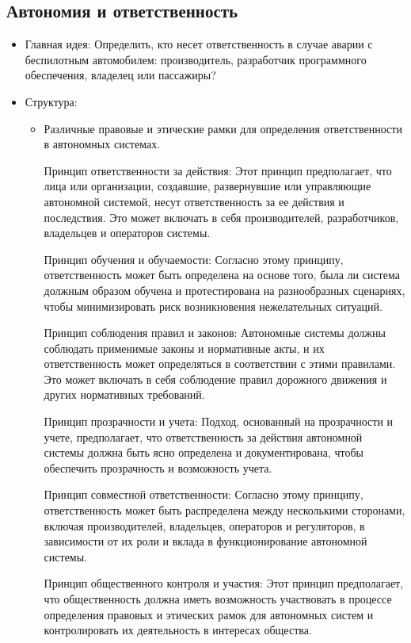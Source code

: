 \documentclass{article}
\begin{document}
\subsection{Автономия и ответственность}

\begin{itemize}
    \item Главная идея:  Определить, кто несет ответственность в случае аварии с беспилотным автомобилем: производитель, разработчик программного обеспечения, владелец или пассажиры?
    
    \item Структура:
    \begin{itemize}
        \item Различные правовые и этические рамки для определения ответственности в автономных системах.

        Принцип ответственности за действия: Этот принцип предполагает, что лица или организации, создавшие, развернувшие или управляющие автономной системой, несут ответственность за ее действия и последствия. Это может включать в себя производителей, разработчиков, владельцев и операторов системы.

        Принцип обучения и обучаемости: Согласно этому принципу, ответственность может быть определена на основе того, была ли система должным образом обучена и протестирована на разнообразных сценариях, чтобы минимизировать риск возникновения нежелательных ситуаций.

        Принцип соблюдения правил и законов: Автономные системы должны соблюдать применимые законы и нормативные акты, и их ответственность может определяться в соответствии с этими правилами. Это может включать в себя соблюдение правил дорожного движения и других нормативных требований.

        Принцип прозрачности и учета: Подход, основанный на прозрачности и учете, предполагает, что ответственность за действия автономной системы должна быть ясно определена и документирована, чтобы обеспечить прозрачность и возможность учета.

        Принцип совместной ответственности: Согласно этому принципу, ответственность может быть распределена между несколькими сторонами, включая производителей, владельцев, операторов и регуляторов, в зависимости от их роли и вклада в функционирование автономной системы.

        Принцип общественного контроля и участия: Этот принцип предполагает, что общественность должна иметь возможность участвовать в процессе определения правовых и этических рамок для автономных систем и контролировать их деятельность в интересах общества.
        

\end{itemize}
\end{itemize}
\end{document}
